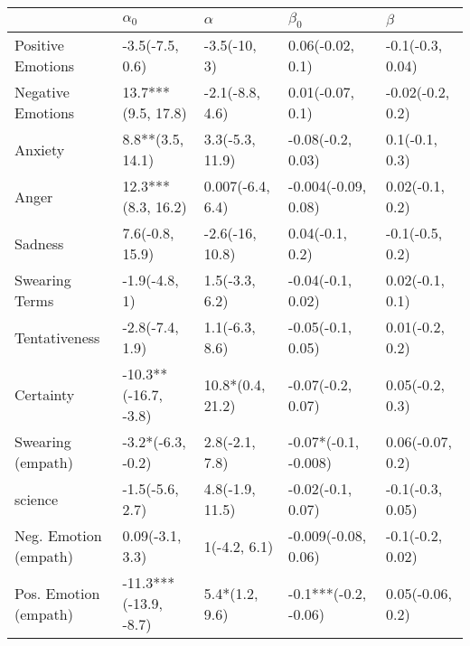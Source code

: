 \begin{tabular}{lllll}
\toprule
{} &             $\alpha_0$ &          $\alpha$ &             $\beta_0$ &           $\beta$ \\
\midrule
Positive Emotions     &        -3.5(-7.5, 0.6) &      -3.5(-10, 3) &      0.06(-0.02, 0.1) &  -0.1(-0.3, 0.04) \\
Negative Emotions     &     13.7***(9.5, 17.8) &   -2.1(-8.8, 4.6) &      0.01(-0.07, 0.1) &  -0.02(-0.2, 0.2) \\
Anxiety               &       8.8**(3.5, 14.1) &   3.3(-5.3, 11.9) &     -0.08(-0.2, 0.03) &    0.1(-0.1, 0.3) \\
Anger                 &     12.3***(8.3, 16.2) &  0.007(-6.4, 6.4) &   -0.004(-0.09, 0.08) &   0.02(-0.1, 0.2) \\
Sadness               &        7.6(-0.8, 15.9) &   -2.6(-16, 10.8) &       0.04(-0.1, 0.2) &   -0.1(-0.5, 0.2) \\
Swearing Terms        &          -1.9(-4.8, 1) &    1.5(-3.3, 6.2) &     -0.04(-0.1, 0.02) &   0.02(-0.1, 0.1) \\
Tentativeness         &        -2.8(-7.4, 1.9) &    1.1(-6.3, 8.6) &     -0.05(-0.1, 0.05) &   0.01(-0.2, 0.2) \\
Certainty             &   -10.3**(-16.7, -3.8) &  10.8*(0.4, 21.2) &     -0.07(-0.2, 0.07) &   0.05(-0.2, 0.3) \\
Swearing (empath)     &      -3.2*(-6.3, -0.2) &    2.8(-2.1, 7.8) &  -0.07*(-0.1, -0.008) &  0.06(-0.07, 0.2) \\
science               &        -1.5(-5.6, 2.7) &   4.8(-1.9, 11.5) &     -0.02(-0.1, 0.07) &  -0.1(-0.3, 0.05) \\
Neg. Emotion (empath) &        0.09(-3.1, 3.3) &      1(-4.2, 6.1) &   -0.009(-0.08, 0.06) &  -0.1(-0.2, 0.02) \\
Pos. Emotion (empath) &  -11.3***(-13.9, -8.7) &    5.4*(1.2, 9.6) &  -0.1***(-0.2, -0.06) &  0.05(-0.06, 0.2) \\
\bottomrule
\end{tabular}

